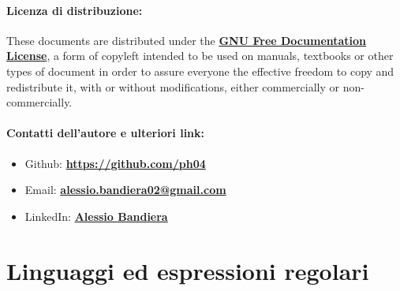 \documentclass[a4paper, 12pt]{report}
\begin{document}
    \quad

    \subsubsection{Licenza di distribuzione:}
    
    These documents are distributed under the \textbf{\href{https://www.gnu.org/licenses/fdl-1.3.txt}{GNU Free Documentation License}}, a form of copyleft intended to be used on manuals, textbooks or other types of document in order to assure everyone the effective freedom to copy and redistribute it, with or without modifications, either commercially or non-commercially.
    
    \quad

    \subsubsection{Contatti dell'autore e ulteriori link:}
    \begin{itemize}


        \item Github: \textbf{\href{https://github.com/ph04}{https://github.com/ph04}}
        \item Email: \textbf{\href{mailto:alessio.bandiera02@gmail.com}{alessio.bandiera02@gmail.com}}
        \item LinkedIn: \textbf{\href{https://www.linkedin.com/in/alessio-bandiera-a53767223/}{Alessio Bandiera}}
    \end{itemize}


    \chapter{Linguaggi ed espressioni regolari}
\end{document}
